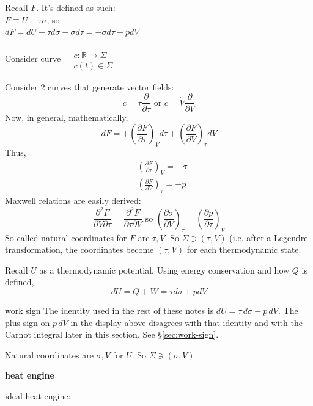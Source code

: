 Recall $F$. It's defined as such: \\
$F\equiv U -\tau \sigma$, so \\
$dF = dU- \tau d\sigma - \sigma d\tau = -\sigma d\tau - pdV$

Consider curve $\begin{aligned} & \quad \\
  & c : \mathbb{R} \to \Sigma \\
  & c(t) \in \Sigma \end{aligned}$

Consider 2 curves that generate vector fields: 
\[
\dot{c} = \dot{\tau} \frac{ \partial }{ \partial \tau } \text{ or } \dot{c} = \dot{V} \frac{ \partial }{ \partial V}
\]
Now, in general, mathematically,
\[
dF = + \left( \frac{ \partial F}{ \partial \tau } \right)_V d\tau + \left( \frac{ \partial F}{ \partial V} \right)_{\tau} dV
\]
Thus,
\[
\begin{aligned}
  & \left( \frac{ \partial F}{ \partial \tau} \right)_V = -\sigma \\ 
  & \left( \frac{ \partial F}{ \partial V} \right)_{\tau} = -p 
\end{aligned}
\]
Maxwell relations are easily derived:
\[
\frac{ \partial^2 F}{ \partial V \partial \tau} = \frac{ \partial^2 F}{ \partial \tau \partial V} \text{ so } \left( \frac{ \partial \sigma }{ \partial V} \right)_{\tau} = \left( \frac{ \partial p }{ \partial \tau} \right)_V
\]
So-called natural coordinates for $F$ are $\tau,V$.  So $\Sigma \ni (\tau,V)$ (i.e. after a Legendre transformation, the coordinates become $(\tau,V)$ for each thermodynamic state.  

Recall $U$ as a thermodynamic potential.  Using energy conservation and how $Q$ is defined, 
\[
dU = Q + W = \tau d\sigma +  pdV
\]
\begin{correction}{work sign}
The identity used in the rest of these notes is $dU = \tau\, d\sigma - p\, dV$.
The plus sign on $p\, dV$ in the display above disagrees with that identity and with the Carnot integral later in this section.
See \S\ref{sec:work-sign}.
\end{correction}
Natural coordinates are $\sigma, V$ for $U$.  So $\Sigma \ni (\sigma, V)$.  


\textbf{heat engine}

ideal heat engine: 

